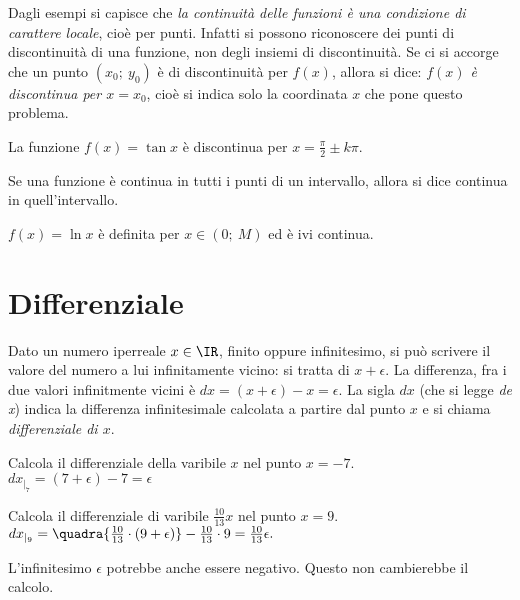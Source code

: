 Dagli esempi si capisce che \emph{la continuità delle funzioni è una condizione 
di carattere locale}, cioè per punti. Infatti si possono riconoscere dei punti
di discontinuità di una funzione, non degli insiemi di discontinuità.
Se ci si accorge che un punto $(x_0;\ y_0)$ è di discontinuità
per $f(x)$, allora si dice: \emph{$f(x)$ è discontinua per $x=x_0$},
cioè si indica solo la coordinata $x$ che pone questo problema.
\begin{esempio}
 La funzione $f(x)= \tan x$ è discontinua per $x=\frac{\pi}{2}\pm k\pi$.
\end{esempio}

\begin{definizione}
Se una funzione è continua in tutti i punti di un intervallo, allora si dice 
continua in quell'intervallo.
\end{definizione}
\begin{esempio}
 $f(x)=\ln x$ è definita per $x \in (0;\ M)$ ed è ivi continua.
\end{esempio}





\section{Differenziale}
\label{sec:04_differenziale}
Dato un numero iperreale $x\in\IR$, finito oppure infinitesimo, si può scrivere il 
valore del numero a lui infinitamente vicino: si tratta di $x+\epsilon$. La differenza, 
fra i due valori infinitmente vicini è $dx=(x+\epsilon)-x=\epsilon$.
La sigla $dx$ (che si legge \emph{de x}) indica la differenza infinitesimale calcolata
a partire dal punto $x$ e si chiama \emph{differenziale di $x$}.

\begin{esempio}
 Calcola il differenziale della varibile $x$ nel punto $x=-7$.\\
 $dx_{|_7}=(7+\epsilon)-7=\epsilon$
\end{esempio}

\begin{esempio}
 Calcola il differenziale di varibile $\frac{10}{13}x$ nel punto $x=9$.\\
 $dx_{|_9}=\quadra{\frac{10}{13}\cdot(9+\epsilon)}-\frac{10}{13}\cdot 9=\frac{10}{13}\epsilon.$
 \end{esempio}

\begin{osservazione}
 L'infinitesimo $\epsilon$ potrebbe anche essere negativo. Questo non cambierebbe 
 il calcolo.
\end{osservazione}

